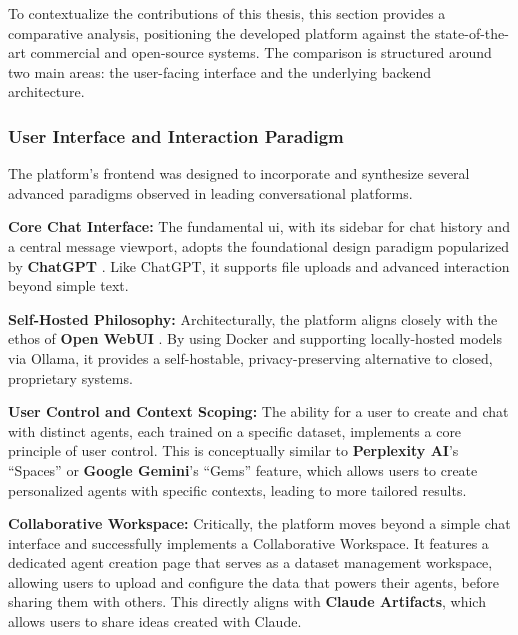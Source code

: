 To contextualize the contributions of this thesis, this section provides a comparative analysis, positioning the developed platform against the state-of-the-art commercial and open-source systems. The comparison is structured around two main areas: the user-facing interface and the underlying backend architecture.

\subsubsection{User Interface and Interaction Paradigm}

The platform's frontend was designed to incorporate and synthesize several advanced paradigms observed in leading conversational platforms.

\begin{compactitem}[\textbullet]
    \item \textbf{Core Chat Interface:} The fundamental \acs{ui}, with its sidebar for chat history and a central message viewport, adopts the foundational design paradigm popularized by \textbf{ChatGPT} \cite{CHATGPT}. Like ChatGPT, it supports file uploads and advanced interaction beyond simple text.
    
    \item \textbf{Self-Hosted Philosophy:} Architecturally, the platform aligns closely with the ethos of \textbf{Open WebUI} \cite{OPENWEBUI}. By using Docker and supporting locally-hosted models via Ollama, it provides a self-hostable, privacy-preserving alternative to closed, proprietary systems.

    \item \textbf{User Control and Context Scoping:} The ability for a user to create and chat with distinct agents, each trained on a specific dataset, implements a core principle of user control. This is conceptually similar to \textbf{Perplexity AI}'s ``Spaces'' \cite{PERPLEXITY} or \textbf{Google Gemini}'s ``Gems'' feature, which allows users to create personalized agents with specific contexts, leading to more tailored results.

    \item \textbf{Collaborative Workspace:} Critically, the platform moves beyond a simple chat interface and successfully implements a Collaborative Workspace. It features a dedicated agent creation page that serves as a dataset management workspace, allowing users to upload and configure the data that powers their agents, before sharing them with others. This directly aligns with \textbf{Claude Artifacts}, which allows users to share ideas created with Claude.
\end{compactitem}

